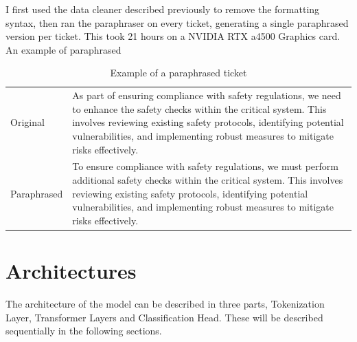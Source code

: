 \documentclass{UoYCSproject}
\begin{document}
    I first used the data cleaner described previously to remove the formatting syntax, then ran the paraphraser on every ticket, generating a single paraphrased version per ticket.
    This took 21 hours on a NVIDIA RTX a4500 Graphics card. An example of paraphrased  \par
    \begin{table}
    \centering
    \begin{tabular}{p{2.5cm}p{9cm}}
    \toprule
    Original    & As part of ensuring compliance with safety regulations, we need to enhance the safety checks within the critical system. This involves reviewing existing safety protocols, identifying potential vulnerabilities, and implementing robust measures to mitigate risks effectively. \\\addlinespace[0.5em]
    Paraphrased & To ensure compliance with safety regulations, we must perform additional safety checks within the critical system. This involves reviewing existing safety protocols, identifying potential vulnerabilities, and implementing robust measures to mitigate risks effectively.       \\
    \bottomrule
    \end{tabular}

    \caption{Example of a paraphrased ticket}
    \end{table}


    \section{Architectures}\label{sec:architectures}
    The architecture of the model can be described in three parts, Tokenization Layer, Transformer Layers and Classification Head.
    These will be described sequentially in the following sections.\par
\end{document}
